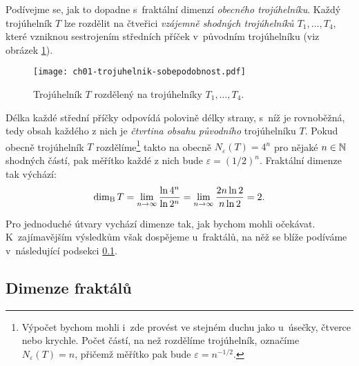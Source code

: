 \begin{example}\label{ex:fraktalni-dimenze-trojuhelnik}
    Podívejme se, jak to dopadne s~fraktální dimenzí \emph{obecného trojúhelníku}. Každý trojúhelník $T$ lze rozdělit na čtveřici \emph{vzájemně shodných trojúhelníků $T_1,\dots,T_4$}, které vzniknou sestrojením středních příček v~původním trojúhelníku (viz obrázek \ref{fig:trojuhelnik-sobepodobnost}).
    \begin{figure}[h]
        \centering
        \texttt{[image: ch01-trojuhelnik-sobepodobnost.pdf]}
        \caption{Trojúhelník $T$ rozdělený na trojúhelníky $T_1,\dots,T_4$.}
        \label{fig:trojuhelnik-sobepodobnost}
    \end{figure}
    Délka každé střední příčky odpovídá polovině délky strany, s~níž je rovnoběžná, tedy obsah každého z nich je \emph{čtvrtina obsahu původního} trojúhelníku $T$. Pokud obecně trojúhelník $T$ rozdělíme\footnote{Výpočet bychom mohli i~zde provést ve stejném duchu jako u~úsečky, čtverce nebo krychle. Počet částí, na než rozdělíme trojúhelník, označíme $N_\varepsilon(T)=n$, přičemž měřítko pak bude $\varepsilon=n^{-1/2}$.} takto na obecně $N_\varepsilon(T)=4^n$ pro nějaké $n\in\mathbb{N}$ shodných částí, pak měřítko každé z nich bude $\varepsilon=(1/2)^n$. Fraktální dimenze tak výchází:
    \[\operatorname{dim_B}{T}=\lim_{n\to\infty}{\dfrac{\ln{4^n}}{\ln{2^n}}}=\lim_{n\to\infty}{\dfrac{2n\ln{2}}{n\ln{2}}}=2.\]
\end{example}
Pro jednoduché útvary vychází dimenze tak, jak bychom mohli očekávat. K~zajímavějším výsledkům však dospějeme u~fraktálů, na něž se blíže podíváme v~následující podsekci \ref{subsec:dimenze-fraktalu}.

\subsection{Dimenze fraktálů}\label{subsec:dimenze-fraktalu}

